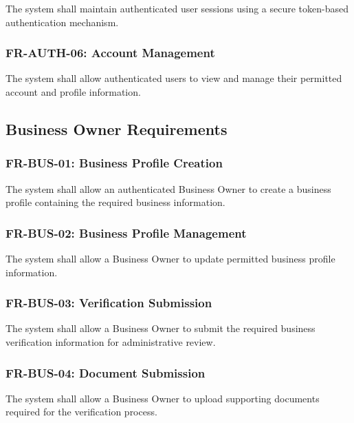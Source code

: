 The system shall maintain authenticated user sessions using a secure
token-based authentication mechanism.

\subsubsection{FR-AUTH-06: Account Management}

The system shall allow authenticated users to view and manage their
permitted account and profile information.



\subsection{Business Owner Requirements}

\subsubsection{FR-BUS-01: Business Profile Creation}

The system shall allow an authenticated Business Owner to create a business
profile containing the required business information.

\subsubsection{FR-BUS-02: Business Profile Management}

The system shall allow a Business Owner to update permitted business profile
information.

\subsubsection{FR-BUS-03: Verification Submission}

The system shall allow a Business Owner to submit the required business
verification information for administrative review.

\subsubsection{FR-BUS-04: Document Submission}

The system shall allow a Business Owner to upload supporting documents
required for the verification process.

